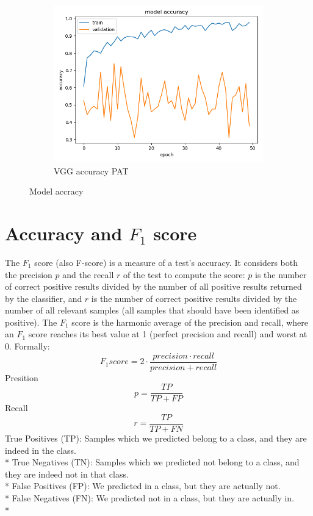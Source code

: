 \begin{figure}
\begin{subfigure}[b]{.3\linewidth}
\includegraphics[width=\linewidth]{Figs/resnet_pat_acc.jpg}
\caption{VGG accuracy PAT}\label{fig:tiger}
\end{subfigure}
\caption{Model accracy}
\label{fig:loss}
\end{figure}



\section{Accuracy and $F_1$ score}
The $F_1$ score (also F-score) is a measure of a test's accuracy. It considers both the precision $p$ and the recall $r$ of the test to compute the score: $p$ is the number of correct positive results divided by the number of all positive results returned by the classifier, and $r$ is the number of correct positive results divided by the number of all relevant samples (all samples that should have been identified as positive). The $F_1$ score is the harmonic average of the precision and recall, where an $F_1$ score reaches its best value at 1 (perfect precision and recall) and worst at 0.
Formally: $$F_1 score = 2 \cdot \frac{precision \cdot recall}{precision + recall}$$
Presition $$p = \frac{TP}{TP + FP}$$
Recall $$r = \frac{TP}{TP + FN}$$
True Positives (TP): Samples which we predicted belong to a class, and they are indeed in the class.\\*
True Negatives (TN): Samples which we predicted not belong to a class, and they are indeed not in that class.\\*
False Positives (FP): We predicted in a class, but they are actually not.\\*
False Negatives (FN): We predicted not in a class, but they are actually in.\\*


